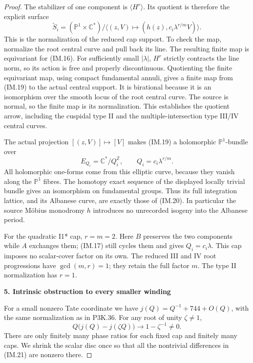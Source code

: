 \begin{proof}
The stabilizer of one component is \(\langle H^r\rangle\).
Its quotient is therefore the explicit surface
\[
  \widetilde S_i=
  (\mathbb P^1\times\mathbb C^*)/\langle
       (z,V)\longmapsto(h(z),c_i\lambda^{r/m}V)
                                      \rangle .       \tag{IM.19}
\]
This is the normalization of the reduced cap support. To check the
map, normalize the root central curve and pull back its line. The
resulting finite map is equivariant for (IM.16). For sufficiently
small \(|\lambda|\), \(H^r\) strictly contracts the line norm,
so its action is free and properly discontinuous. Quotienting the
finite equivariant map, using compact fundamental annuli, gives a
finite map from (IM.19) to the actual central support. It is
birational because it is an isomorphism over the smooth locus of
the root central curve. The source is normal, so the finite map is
its normalization. This establishes the quotient arrow, including
the cuspidal type II and the multiple-intersection type III/IV
central curves.

The actual projection \([(z,V)]\mapsto[V]\) makes (IM.19) a
holomorphic \(\mathbb P^1\)-bundle over
\[
            E_{Q_i}=\mathbb C^*/Q_i^{\mathbb Z},
            \qquad Q_i=c_i\lambda^{r/m}.             \tag{IM.20}
\]
All holomorphic one-forms come from this elliptic curve, because
they vanish along the \(\mathbb P^1\) fibres. The homotopy exact
sequence of the displayed locally trivial bundle gives an
isomorphism on fundamental groups. Thus its full integration
lattice, and its Albanese curve, are exactly those of (IM.20).
In particular the source Möbius monodromy \(h\) introduces no
unrecorded isogeny into the Albanese period.

For the quadratic I1* cap, \(r=m=2\). Here \(B\) preserves
the two components while \(A\) exchanges them; (IM.17) still
cycles them and gives \(Q_i=c_i\lambda\). This cap imposes
no scalar-cover factor on its own. The reduced III and IV root
progressions have \(\gcd(m,r)=1\); they retain the full factor
\(m\). The type II normalization has \(r=1\).

\par

\medskip\noindent\textbf{5. Intrinsic obstruction to every smaller winding}

\par\nobreak

For a small nonzero Tate coordinate we have
\(j(Q)=Q^{-1}+744+O(Q)\), with the same normalization as in
P3K.36. For any root of unity \(\zeta\ne1\),
\[
      Q\bigl(j(Q)-j(\zeta Q)\bigr)
                         \longrightarrow1-\zeta^{-1}\ne0.
                                                               \tag{IM.21}
\]
There are only finitely many phase ratios for each fixed cap and
finitely many caps. We shrink the scalar disc once so that all the
nontrivial differences in (IM.21) are nonzero there.


\end{proof}
